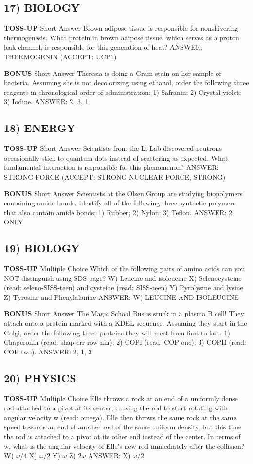 \documentclass{article}
\begin{document}
\subsection*{17) BIOLOGY}
\textbf{TOSS-UP}
Short Answer Brown adipose tissue is responsible for nonshivering thermogenesis. What protein in brown adipose tissue, which serves as a proton leak channel, is responsible for this generation of heat?
ANSWER: THERMOGENIN (ACCEPT: UCP1)

\textbf{BONUS}
Short Answer Theresia is doing a Gram stain on her sample of bacteria. Assuming she is not decolorizing using ethanol, order the following three reagents in chronological order of administration: 1) Safranin; 2) Crystal violet; 3) Iodine.
ANSWER: 2, 3, 1

\subsection*{18) ENERGY}
\textbf{TOSS-UP}
Short Answer Scientists from the Li Lab discovered neutrons occasionally stick to quantum dots instead of scattering as expected. What fundamental interaction is responsible for this phenomenon?
ANSWER: STRONG FORCE (ACCEPT: STRONG NUCLEAR FORCE, STRONG)

\textbf{BONUS}
Short Answer Scientists at the Olsen Group are studying biopolymers containing amide bonds. Identify all of the following three synthetic polymers that also contain amide bonds: 1) Rubber; 2) Nylon; 3) Teflon.
ANSWER: 2 ONLY

\subsection*{19) BIOLOGY}
\textbf{TOSS-UP}
Multiple Choice Which of the following pairs of amino acids can you NOT distinguish using SDS page?
W) Leucine and isoleucine
X) Selenocysteine (read: seleno-SISS-teen) and cysteine (read: SISS-teen)
Y) Pyrolysine and lysine
Z) Tyrosine and Phenylalanine
ANSWER: W) LEUCINE AND ISOLEUCINE

\textbf{BONUS}
Short Answer The Magic School Bus is stuck in a plasma B cell! They attach onto a protein marked with a KDEL sequence. Assuming they start in the Golgi, order the following three proteins they will meet from first to last: 1) Chaperonin (read: shap-err-row-nin); 2) COPI (read: COP one); 3) COPII (read: COP two).
ANSWER: 2, 1, 3

\subsection*{20) PHYSICS}
\textbf{TOSS-UP}
Multiple Choice Elle throws a rock at an end of a uniformly dense rod attached to a pivot at its center, causing the rod to start rotating with angular velocity w (read: omega). Elle then throws the same rock at the same speed towards an end of another rod of the same uniform density, but this time the rod is attached to a pivot at its other end instead of the center. In terms of w, what is the angular velocity of Elle's new rod immediately after the collision?
W) $\omega/4$
X) $\omega/2$
Y) $\omega$
Z) $2\omega$
ANSWER: X) $\omega/2$
\end{document}
